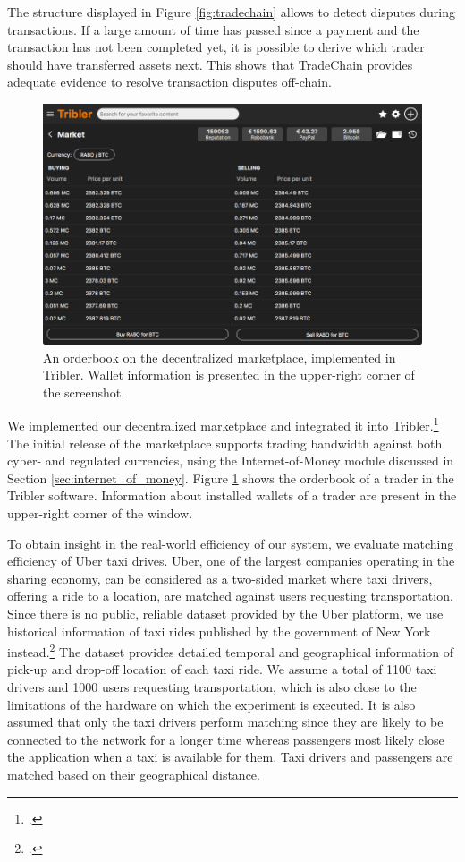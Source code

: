 \documentclass[USenglish]{article}
\begin{document}
The structure displayed in Figure \ref{fig:tradechain} allows to detect disputes during transactions.
If a large amount of time has passed since a payment and the transaction has not been completed yet, it is possible to derive which trader should have transferred assets next.
This shows that TradeChain provides adequate evidence to resolve transaction disputes off-chain.

\begin{figure}[t]
	\centering
	\includegraphics[width=.9\columnwidth]{assets/tribler_market}
	\caption{An orderbook on the decentralized marketplace, implemented in Tribler. Wallet information is presented in the upper-right corner of the screenshot.}
	\label{fig:tribler_market}
\end{figure}

We implemented our decentralized marketplace and integrated it into Tribler.\footcite{pouwelse2008tribler}
The initial release of the marketplace supports trading bandwidth against both cyber- and regulated currencies, using the Internet-of-Money module discussed in Section \ref{sec:internet_of_money}.
Figure \ref{fig:tribler_market} shows the orderbook of a trader in the Tribler software.
Information about installed wallets of a trader are present in the upper-right corner of the window.

To obtain insight in the real-world efficiency of our system, we evaluate matching efficiency of Uber taxi drives.
Uber, one of the largest companies operating in the sharing economy, can be considered as a two-sided market where taxi drivers, offering a ride to a location, are matched against users requesting transportation.
Since there is no public, reliable dataset provided by the Uber platform, we use historical information of taxi rides published by the government of New York instead.\footcite{newyorktaxi}
The dataset provides detailed temporal and geographical information of pick-up and drop-off location of each taxi ride.
We assume a total of 1100 taxi drivers and 1000 users requesting transportation, which is also close to the limitations of the hardware on which the experiment is executed.
It is also assumed that only the taxi drivers perform matching since they are likely to be connected to the network for a longer time whereas passengers most likely close the application when a taxi is available for them.
Taxi drivers and passengers are matched based on their geographical distance.
\end{document}
